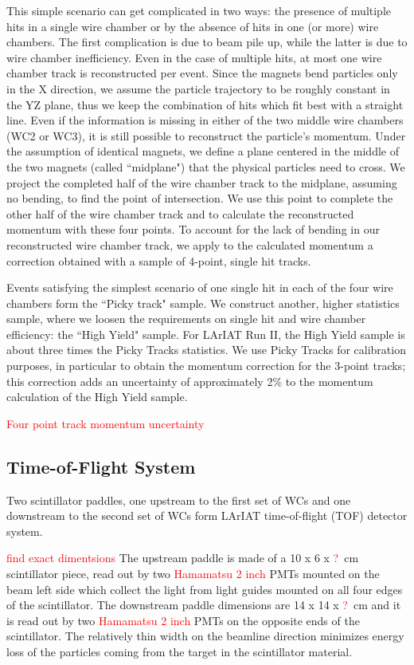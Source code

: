 This simple scenario can get complicated in two ways:  the presence of multiple hits in a single wire chamber or by the absence of hits in one (or more) wire chambers. The first complication is due to beam pile up, while the latter is due to wire chamber inefficiency. Even in the case of multiple hits, at most one wire chamber track is reconstructed per event. Since the magnets bend particles only in the X direction, we assume the particle trajectory to be roughly constant in the YZ plane, thus we keep the combination of hits which fit best with a straight line.  Even if the information is missing in either of the two middle wire chambers (WC2 or WC3), it is still possible to reconstruct the particle's momentum. Under the assumption of identical magnets, we define a plane centered in the middle of the two magnets (called ``midplane") that the physical particles need to cross. We project the completed half of the wire chamber track to the midplane, assuming no bending, to find the point of intersection. We use this point to complete the other half of the wire chamber track and to calculate the reconstructed momentum  with these four points. To account for the lack of bending in our reconstructed wire chamber track, we apply to the calculated momentum  a correction obtained with a sample of 4-point, single hit tracks.

Events satisfying the simplest scenario of one single hit in each of the four wire chambers form the ``Picky track" sample.  We construct another, higher statistics sample, where we loosen the requirements on single hit and wire chamber efficiency: the ``High Yield" sample. For LArIAT Run II, the High Yield sample is about three times the Picky Tracks statistics. We use Picky Tracks for calibration purposes, in particular to obtain the momentum correction for the 3-point tracks; this correction adds an uncertainty of approximately 2\% to the momentum calculation of the High Yield sample.

\textcolor{red}{Four point track momentum uncertainty}

\subsection{Time-of-Flight System}\label{sec:TOF}
Two scintillator paddles, one upstream to the first set of WCs and one downstream to the second set of WCs  form LArIAT  time-of-flight (TOF) detector system. 

 \textcolor{red}{find exact dimentsions}
The upstream paddle is made of a 10 x 6 x \textcolor{red}{?}~cm scintillator piece, read out by two \textcolor{red}{Hamamatsu 2 inch} PMTs mounted on the beam left side which collect the light from light guides mounted on all four edges of the scintillator. The downstream paddle dimensions are  14 x 14 x \textcolor{red}{?}~cm and it is read out by two \textcolor{red}{Hamamatsu 2 inch} PMTs on the opposite ends of the scintillator.
The relatively thin width on the beamline direction minimizes energy loss of the particles coming from the target in the scintillator material.

